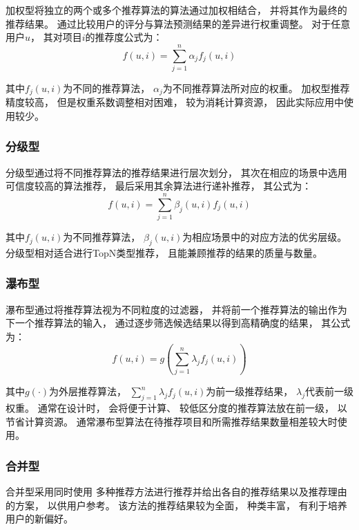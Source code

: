 加权型将独立的两个或多个推荐算法的算法通过加权相结合，
并将其作为最终的推荐结果。
通过比较用户的评分与算法预测结果的差异进行权重调整。
对于任意用户$u$，
其对项目$i$的推荐度公式为：
\begin{equation}
    f(u,i)=\sum_{j=1}^n\alpha_jf_j(u,i)
\end{equation}

其中$f_j(u,i)$为不同的推荐算法，
$\alpha_j$为不同推荐算法所对应的权重。
加权型推荐精度较高，
但是权重系数调整相对困难，
较为消耗计算资源，
因此实际应用中使用较少。

\subsubsection{分级型}

分级型通过将不同推荐算法的推荐结果进行层次划分，
其次在相应的场景中选用可信度较高的算法推荐，
最后采用其余算法进行递补推荐，
其公式为：
\begin{equation}
    f(u,i)=\sum_{j=1}^n\beta_j(u,i)f_j(u,i)
\end{equation}

其中$f_j(u,i)$为不同推荐算法，
$\beta_j(u,i)$为相应场景中的对应方法的优劣层级。
分级型相对适合进行TopN类型推荐，
且能兼顾推荐的结果的质量与数量。

\subsubsection{瀑布型}

瀑布型通过将推荐算法视为不同粒度的过滤器，
并将前一个推荐算法的输出作为下一个推荐算法的输入，
通过逐步筛选候选结果以得到高精确度的结果，
其公式为：
\begin{equation}
    f(u,i)=g\left(\sum_{j=1}^n\lambda_jf_j(u,i)\right)
\end{equation}

其中$g(\cdot)$为外层推荐算法，
$\sum_{j=1}^n\lambda_jf_j(u,i)$为前一级推荐结果，
$\lambda_j$代表前一级权重。
通常在设计时，
会将便于计算、
较低区分度的推荐算法放在前一级，
以节省计算资源。
通常瀑布型算法在待推荐项目和所需推荐结果数量相差较大时使用。

\subsubsection{合并型}

合并型采用同时使用
多种推荐方法进行推荐并给出各自的推荐结果以及推荐理由
的方案，
以供用户参考。
该方法的推荐结果较为全面，
种类丰富，
有利于培养用户的新偏好。

